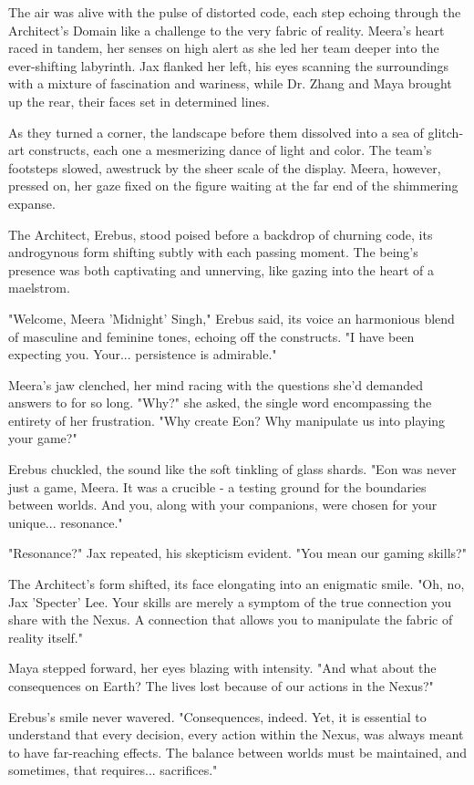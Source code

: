 \documentclass[12pt]{book}
\begin{document}
The air was alive with the pulse of distorted code, each step echoing
through the Architect's Domain like a challenge to the very fabric of
reality. Meera's heart raced in tandem, her senses on high alert as she
led her team deeper into the ever-shifting labyrinth. Jax flanked her
left, his eyes scanning the surroundings with a mixture of fascination
and wariness, while Dr. Zhang and Maya brought up the rear, their faces
set in determined lines.

As they turned a corner, the landscape before them dissolved into a sea
of glitch-art constructs, each one a mesmerizing dance of light and
color. The team's footsteps slowed, awestruck by the sheer scale of the
display. Meera, however, pressed on, her gaze fixed on the figure
waiting at the far end of the shimmering expanse.

The Architect, Erebus, stood poised before a backdrop of churning code,
its androgynous form shifting subtly with each passing moment. The
being's presence was both captivating and unnerving, like gazing into
the heart of a maelstrom.

"Welcome, Meera 'Midnight' Singh," Erebus said, its voice an harmonious
blend of masculine and feminine tones, echoing off the constructs. "I
have been expecting you. Your... persistence is admirable."

Meera's jaw clenched, her mind racing with the questions she'd demanded
answers to for so long. "Why?" she asked, the single word encompassing
the entirety of her frustration. "Why create Eon? Why manipulate us into
playing your game?"

Erebus chuckled, the sound like the soft tinkling of glass shards. "Eon
was never just a game, Meera. It was a crucible - a testing ground for
the boundaries between worlds. And you, along with your companions, were
chosen for your unique... resonance."

"Resonance?" Jax repeated, his skepticism evident. "You mean our gaming
skills?"

The Architect's form shifted, its face elongating into an enigmatic
smile. "Oh, no, Jax 'Specter' Lee. Your skills are merely a symptom of
the true connection you share with the Nexus. A connection that allows
you to manipulate the fabric of reality itself."

Maya stepped forward, her eyes blazing with intensity. "And what about
the consequences on Earth? The lives lost because of our actions in the
Nexus?"

Erebus's smile never wavered. "Consequences, indeed. Yet, it is
essential to understand that every decision, every action within the
Nexus, was always meant to have far-reaching effects. The balance
between worlds must be maintained, and sometimes, that requires...
sacrifices."
\end{document}
